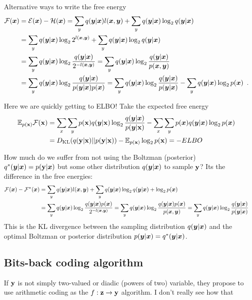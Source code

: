 \begin{notebox}
Alternative ways to write the free energy
\begin{align*}
\mathcal{F}({\bm{x}}) & = \mathcal{E}({\bm{x}}) - \mathcal{H}({\bm{x}})
= \sum_y q({\bm{y}} | {\bm{x}}) l({\bm{x}}, {\bm{y}}) + \sum_y q({\bm{y}} | {\bm{x}}) \log_2 q({\bm{y}} | {\bm{x}}) \\
& = \sum_y q({\bm{y}} | {\bm{x}}) \log_2 2^{l({\bm{x}}, {\bm{y}})} + \sum_y q({\bm{y}} | {\bm{x}}) \log_2 q({\bm{y}} | {\bm{x}}) \\
& = \sum_y q({\bm{y}} | {\bm{x}}) \log_2 \frac{ q({\bm{y}} | {\bm{x}})}{2^{-l({\bm{x}}, {\bm{y}})}}
= \sum_y q({\bm{y}} | {\bm{x}}) \log_2 \frac{ q({\bm{y}} | {\bm{x}})}{p({\bm{x}}, {\bm{y}})} \\
& = \sum_y q({\bm{y}} | {\bm{x}}) \log_2 \frac{ q({\bm{y}} | {\bm{x}})}{p({\bm{y}} | {\bm{x}}) p({\bm{x}})} 
= \sum_y q({\bm{y}} | {\bm{x}}) \log_2 \frac{ q({\bm{y}} | {\bm{x}})}{p({\bm{y}} | {\bm{x}})}
- \sum_y q({\bm{y}} | {\bm{x}}) \log_2 p({\bm{x}})
\enspace .
\end{align*}

Here we are quickly getting to ELBO!
Take the expected free energy
\begin{align}\label{eq:Frey1997_elbo}
\mathbb{E}_{p({\mathbf{x}})} \mathcal{F}({\mathbf{x}})
& = \sum_x \sum_y p({\mathbf{x}}) q({\bm{y}} | {\mathbf{x}}) \log_2 \frac{ q({\bm{y}} | {\bm{x}})}{p({\bm{y}} | {\mathbf{x}})}
- \sum_x \sum_y p({\bm{x}}) q({\bm{y}} | {\bm{x}}) \log_2 p({\bm{x}}) \nonumber \\
& = D_{\mathrm{KL}}(q({\mathbf{y}} | {\mathbf{x}}) || p({\mathbf{y}} | {\mathbf{x}})) - \mathbb{E}_{p({\mathbf{x}})} \log_2 p({\mathbf{x}}) = - ELBO
\end{align}
\end{notebox}

How much do we suffer from not using the Boltzman (posterior) $q^*({\bm{y}} | {\bm{x}}) = p({\mathbf{y}}| {\bm{x}})$ but some other distribution $q({\bm{y}} | {\bm{x}})$ to sample ${\mathbf{y}}$? 
Its the difference in the free energies:
\begin{align*}
\mathcal{F}({\bm{x}}) - \mathcal{F^*}({\bm{x}}) 
& = \sum_y q({\bm{y}} | {\bm{x}}) l({\bm{x}}, {\bm{y}}) + \sum_y q({\bm{y}} | {\bm{x}}) \log_2 q({\bm{y}} | {\bm{x}}) + \log_2 p({\bm{x}}) \nonumber \\
& = \sum_y q({\bm{y}} | {\bm{x}}) \log_2 \frac{q({\bm{y}} | {\bm{x}}) p({\bm{x}})}{2^{-l({\bm{x}}, {\bm{y}})}}
= \sum_y q({\bm{y}} | {\bm{x}}) \log_2 \frac{q({\bm{y}} | {\bm{x}}) p({\bm{x}})}{p({\bm{x}}, {\bm{y}})}
= \sum_y q({\bm{y}} | {\bm{x}}) \log_2 \frac{q({\bm{y}} | {\bm{x}})}{p({\bm{y}} | {\bm{x}})}
\end{align*}
This is the KL divergence between the sampling distribution $q({\bm{y}} | {\bm{x}})$ and the optimal Boltzman or posterior distribution $p({\bm{y}} | {\bm{x}}) = q^*({\bm{y}} | {\bm{x}})$.


\subsection{Bits-back coding algorithm}

If ${\mathbf{y}}$ is not simply two-valued or diadic (powers of two) variable, they propose to use arithmetic coding as the $f : {\mathbf{z}} \to {\mathbf{y}}$ algorithm.
I don't really see how that

